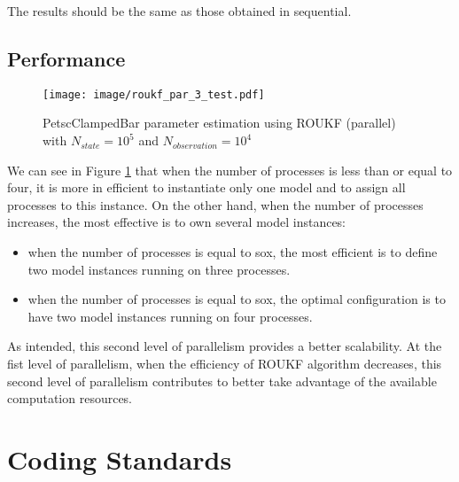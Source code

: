\documentclass{tufte-book}
\begin{document}
The results should be the same as those obtained in sequential.

\hypertarget{par-par-p}{}\section{Performance}\label{par-par-p}


\begin{figure}
  \caption{PetscClampedBar parameter estimation using ROUKF (parallel) with $N_{state} = 10^5$ and $N_{observation} = 10^4$ }

  \vspace{1cm}

  \label{fig:roukf_par_time}
 \hspace{-3cm}
\texttt{[image: image/roukf\_par\_3\_test.pdf]}
\end{figure}


We can see in Figure \ref{fig:roukf_par_time} that when the number of processes is less than or equal to four, it is more in efficient to instantiate only one model and to assign all processes to this instance. On the other hand, when the number of processes increases, the most effective is to own
several model instances:

\begin{itemize}

\item when the number of processes is equal to sox, the most efficient is to define two model instances running on three processes.

\item when the number of processes is equal to sox, the optimal configuration is to have two model instances running on four processes.

\end{itemize}


As intended, this second level of parallelism provides a better scalability. At the fist level of parallelism, when the efficiency of ROUKF algorithm decreases, this second level of parallelism contributes to better take advantage of the  available computation resources.




\appendix
\chapter{Coding Standards}\label{coding_standards}


\end{document}
